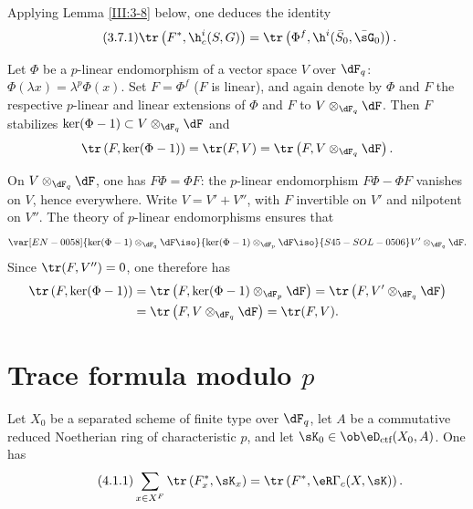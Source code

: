 Applying Lemma \ref{III:3-8} below, one deduces the identity
\begin{equation*}\tag{3.7.1}\label{III:eq:3-7-1}
  \tr\left(F^*,\h_c^i(S,G)\right) = \tr\left(\Phi^f,\h^i(\bar S_0,\bar\sG_0)\right) \text{.}
\end{equation*}






\begin{lemma_}\label{III:3-8}
Let $\Phi$ be a $p$-linear endomorphism of a vector space $V$ over
$\dF_q$: $\Phi(\lambda x) = \lambda^p\Phi(x)$. Set $F=\Phi^f$ ($F$ is
linear), and again denote by $\Phi$ and $F$ the respective $p$-linear and linear extensions of $\Phi$ and $F$ to $V\otimes_{\dF_q}\dF$. Then $F$ stabilizes
$\ker(\Phi-1)\subset V\otimes_{\dF_q}\dF$ and
\[
  \tr\left(F,\ker(\Phi-1)\right) = \tr(F,V) = \tr\left(F,V\otimes_{\dF_q}\dF\right) \text{.}
\]
\end{lemma_}

On $V\otimes_{\dF_q}\dF$, one has $F\Phi = \Phi F$: the $p$-linear
endomorphism $F\Phi-\Phi F$ vanishes on $V$, hence everywhere. Write
$V=V'+V''$, with $F$ invertible on $V'$ and nilpotent on $V''$. The theory
of $p$-linear endomorphisms ensures that
\[
  \var[EN-0058]{\ker(\Phi-1)\otimes_{\dF_q}\dF \iso}{\ker(\Phi-1)\otimes_{\dF_p}\dF \iso}{S45-SOL-0506} V'\otimes_{\dF_q}\dF \text{.}
\]
Since $\tr(F,V'') = 0$, one therefore has
\begin{align*}
  \tr\left(F,\ker(\Phi-1)\right)
    &= \tr\left(F,\ker(\Phi-1)\otimes_{\dF_p}\dF\right) = \tr\left(F,V'\otimes_{\dF_q}\dF\right) \\
    &= \tr\left(F,V\otimes_{\dF_q}\dF\right) = \tr(F,V) \text{.}
\end{align*}











\section{Trace formula modulo \texorpdfstring{$p$}{p}}\label{III:4}






\begin{theorem_}\label{III:4-1}
Let $X_0$ be a separated scheme of finite type over $\dF_q$, let $A$ be a
commutative reduced Noetherian ring of characteristic $p$, and let
$\sK_0\in\ob\eD_\textnormal{ctf}(X_0,A)$. One has
\begin{equation*}\tag{4.1.1}\label{III:eq:4-1-1}
  \sum_{x\in X^F} \tr\left(F_x^*,\sK_x\right) = \tr\left(F^*,\eR\Gamma_c(X,\sK)\right) \text{.}
\end{equation*}
\end{theorem_}






